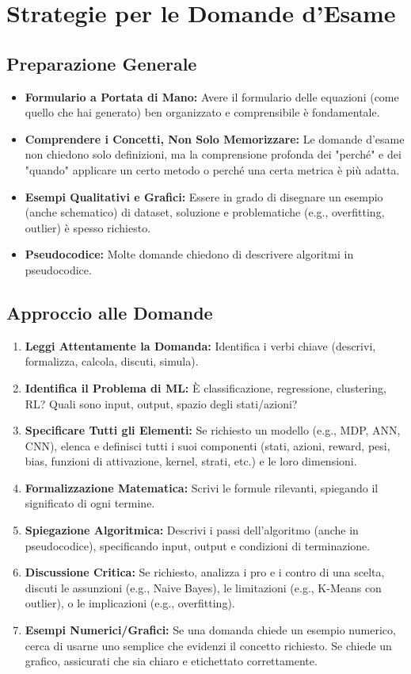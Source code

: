 \documentclass[a4paper,11pt]{article}
\begin{document}
\section{Strategie per le Domande d'Esame}

\subsection{Preparazione Generale}
\begin{itemize}
    \item \textbf{Formulario a Portata di Mano:} Avere il formulario delle equazioni (come quello che hai generato) ben organizzato e comprensibile è fondamentale.
    \item \textbf{Comprendere i Concetti, Non Solo Memorizzare:} Le domande d'esame non chiedono solo definizioni, ma la comprensione profonda dei "perché" e dei "quando" applicare un certo metodo o perché una certa metrica è più adatta.
    \item \textbf{Esempi Qualitativi e Grafici:} Essere in grado di disegnare un esempio (anche schematico) di dataset, soluzione e problematiche (e.g., overfitting, outlier) è spesso richiesto.
    \item \textbf{Pseudocodice:} Molte domande chiedono di descrivere algoritmi in pseudocodice.
\end{itemize}

\subsection{Approccio alle Domande}
\begin{enumerate}
    \item \textbf{Leggi Attentamente la Domanda:} Identifica i verbi chiave (descrivi, formalizza, calcola, discuti, simula).
    \item \textbf{Identifica il Problema di ML:} È classificazione, regressione, clustering, RL? Quali sono input, output, spazio degli stati/azioni?
    \item \textbf{Specificare Tutti gli Elementi:} Se richiesto un modello (e.g., MDP, ANN, CNN), elenca e definisci tutti i suoi componenti (stati, azioni, reward, pesi, bias, funzioni di attivazione, kernel, strati, etc.) e le loro dimensioni.
    \item \textbf{Formalizzazione Matematica:} Scrivi le formule rilevanti, spiegando il significato di ogni termine.
    \item \textbf{Spiegazione Algoritmica:} Descrivi i passi dell'algoritmo (anche in pseudocodice), specificando input, output e condizioni di terminazione.
    \item \textbf{Discussione Critica:} Se richiesto, analizza i pro e i contro di una scelta, discuti le assunzioni (e.g., Naive Bayes), le limitazioni (e.g., K-Means con outlier), o le implicazioni (e.g., overfitting).
    \item \textbf{Esempi Numerici/Grafici:} Se una domanda chiede un esempio numerico, cerca di usarne uno semplice che evidenzi il concetto richiesto. Se chiede un grafico, assicurati che sia chiaro e etichettato correttamente.
\end{enumerate}
\end{document}
